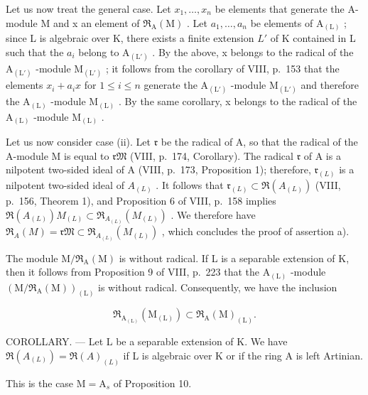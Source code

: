 Let us now treat the general case. Let \(x_{1},\ldots,x_{n}\) be elements that generate the A-module M and x an element of \(\mathfrak{R}_{\mathrm{A}}(\mathrm{M})\) . Let \(a_{1},\ldots,a_{n}\) be elements of \(\mathrm{A}_{(\mathrm{L})}\) ; since L is algebraic over K, there exists a finite extension \(L'\) of K contained in L such that the \(a_{i}\) belong to \(\mathrm{A}_{(\mathrm{L}')}\) . By the above, x belongs to the radical of the \(\mathrm{A}_{(\mathrm{L}')}\) -module \(\mathrm{M}_{(\mathrm{L}')}\) ; it follows from the corollary of VIII, p.~153 that the elements \(x_{i}+a_{i}x\) for \(1\leqslant i\leqslant n\) generate the \(\mathrm{A}_{(\mathrm{L}')}\) -module \(\mathrm{M}_{(\mathrm{L}')}\) and therefore the \(\mathrm{A}_{(\mathrm{L})}\) -module \(\mathrm{M}_{(\mathrm{L})}\) . By the same corollary, x belongs to the radical of the \(\mathrm{A}_{(\mathrm{L})}\) -module \(\mathrm{M}_{(\mathrm{L})}\) .

Let us now consider case (ii). Let \(\mathfrak{r}\) be the radical of A, so that the radical of the A-module M is equal to \(\mathfrak{rM}\) (VIII, p.~174, Corollary). The radical \(\mathfrak{r}\) of A is a nilpotent two-sided ideal of A (VIII, p.~173, Proposition 1); therefore, \(\mathfrak{r}_{(L)}\) is a nilpotent two-sided ideal of \(A_{(L)}\) . It follows that \(\mathfrak{r}_{(L)} \subset \Re(A_{(L)})\) (VIII, p.~156, Theorem 1), and Proposition 6 of VIII, p.~158 implies \(\Re(A_{(L)})M_{(L)} \subset \Re_{A_{(L)}}(M_{(L)})\) . We therefore have \(\Re_A(M) = \mathfrak{rM} \subset \Re_{A_{(L)}}(M_{(L)})\) , which concludes the proof of assertion a).

The module \(\mathrm{M}/\mathfrak{R}_{\mathrm{A}}(\mathrm{M})\) is without radical. If L is a separable extension of K, then it follows from Proposition 9 of VIII, p.~223 that the \(\mathrm{A}_{(\mathrm{L})}\) -module \((\mathrm{M}/\mathfrak{R}_{\mathrm{A}}(\mathrm{M}))_{(\mathrm{L})}\) is without radical. Consequently, we have the inclusion

\[
\mathfrak {R} _ {\mathrm{A} _ {(\mathrm{L})}} (\mathrm{M} _ {(\mathrm{L})}) \subset \mathfrak {R} _ {\mathrm{A}} (\mathrm{M}) _ {(\mathrm{L})}.
\]

COROLLARY. --- Let L be a separable extension of K. We have \(\mathfrak{R}(A_{(L)}) = \mathfrak{R}(A)_{(L)}\) if L is algebraic over K or if the ring A is left Artinian.

This is the case \(\mathrm{M} = \mathrm{A}_s\) of Proposition 10.

